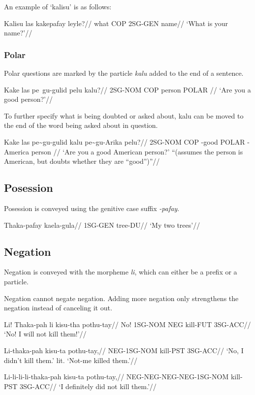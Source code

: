 An example of `kalisu' is as follows:

\ex
\begingl
    \gla  Kalisu las kakepafay leyle?//
    \glb  what COP 2SG-GEN name//
    \glft`What is your name?'//
\endgl
\xe


\subsubsection{Polar}
Polar questions are marked by the particle \emph{kalu} added to the end of a sentence.

\ex
\begingl
    \gla  Kake las pe~gu-gulid pelu kalu?//
    \glb  2SG-NOM COP \agradj{} person POLAR //
    \glft`Are you a good person?'//
\endgl
\xe


To further specify what is being doubted or asked about, kalu can be moved to the end of the word being asked about in question.

\ex
\begingl
\gla  Kake las pe\~{}gu-gulid kalu pe\~{}gu-Arika pelu?//
\glb  2SG-NOM COP \agradj{}-good POLAR \agradj{}-America person //
\glft `Are you a good American person?' ``(assumes the person is American, but doubts whether they are ``good'')''//
\endgl
\xe


\subsection{Posession}
Posession is conveyed using the genitive case suffix \emph{-pafay}.

\ex
\begingl
    \gla  Thaka-pafay kaela-gula//
    \glb  1SG-GEN tree-DU//
    \glft `My two trees'//
\endgl
\xe


\subsection{Negation}
Negation is conveyed with the morpheme \emph{li}, which can either be a prefix or a particle.

Negation cannot negate negation.
Adding more negation only strengthens the negation instead of canceling it out.

\ex
\begingl
    \gla  Li! Thaka-pah li kisu-tha pothu-tay//
    \glb  No! 1SG-NOM NEG kill-FUT 3SG-ACC//
    \glft `No! I will not kill them!'//
\endgl
\xe


\ex
\begingl
    \gla  Li-thaka-pah kisu-ta pothu-tay,//
    \glb  NEG-1SG-NOM kill-PST 3SG-ACC//
    \glft `No, I didn't kill them.' lit. `Not-me killed them.'//
\endgl
\xe

\ex
\begingl
    \gla  Li-li-li-li-thaka-pah kisu-ta pothu-tay,//
    \glb  NEG-NEG-NEG-NEG-1SG-NOM kill-PST 3SG-ACC//
    \glft `I definitely did not kill them.'//
\endgl
\xe

